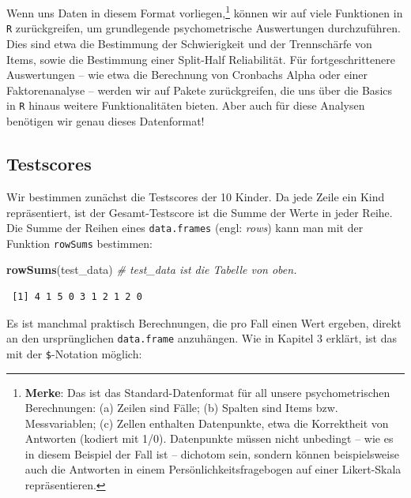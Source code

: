 \documentclass[12pt,]{tufte-book}
\newenvironment{Shaded}{\begin{snugshade}}{\end{snugshade}}
\newcommand{\KeywordTok}[1]{\textcolor[rgb]{0.13,0.29,0.53}{\textbf{#1}}}
\newcommand{\StringTok}[1]{\textcolor[rgb]{0.31,0.60,0.02}{#1}}
\newcommand{\CommentTok}[1]{\textcolor[rgb]{0.56,0.35,0.01}{\textit{#1}}}
\newcommand{\OperatorTok}[1]{\textcolor[rgb]{0.81,0.36,0.00}{\textbf{#1}}}
\newcommand{\NormalTok}[1]{#1}
\theoremstyle{definition}
\theoremstyle{definition}
\theoremstyle{definition}
\theoremstyle{remark}
\begin{document}
~

~

Wenn uns Daten in diesem Format vorliegen,\footnote{\textbf{Merke}: Das
  ist das Standard-Datenformat für all unsere psychometrischen
  Berechnungen: (a) Zeilen sind Fälle; (b) Spalten sind Items bzw.
  Messvariablen; (c) Zellen enthalten Datenpunkte, etwa die Korrektheit
  von Antworten (kodiert mit 1/0). Datenpunkte müssen nicht unbedingt --
  wie es in diesem Beispiel der Fall ist -- dichotom sein, sondern
  können beispielsweise auch die Antworten in einem
  Persönlichkeitsfragebogen auf einer Likert-Skala repräsentieren.}
können wir auf viele Funktionen in \texttt{R} zurückgreifen, um
grundlegende psychometrische Auswertungen durchzuführen. Dies sind etwa
die Bestimmung der Schwierigkeit und der Trennschärfe von Items, sowie
die Bestimmung einer Split-Half Reliabilität. Für fortgeschrittenere
Auswertungen -- wie etwa die Berechnung von Cronbachs Alpha oder einer
Faktorenanalyse -- werden wir auf Pakete zurückgreifen, die uns über die
Basics in \texttt{R} hinaus weitere Funktionalitäten bieten. Aber auch
für diese Analysen benötigen wir genau dieses Datenformat!

\subsection{Testscores}\label{testscores}

Wir bestimmen zunächst die Testscores der 10 Kinder. Da jede Zeile ein
Kind repräsentiert, ist der Gesamt-Testscore ist die Summe der Werte in
jeder Reihe. Die Summe der Reihen eines \texttt{data.frames} (engl:
\emph{rows}) kann man mit der Funktion \texttt{rowSums} bestimmen:

\begin{Shaded}
\begin{Highlighting}[]
\KeywordTok{rowSums}\NormalTok{(test_data)  }\CommentTok{# test_data ist die Tabelle von oben.}
\end{Highlighting}
\end{Shaded}

\begin{verbatim}
 [1] 4 1 5 0 3 1 2 1 2 0
\end{verbatim}

Es ist manchmal praktisch Berechnungen, die pro Fall einen Wert ergeben,
direkt an den ursprünglichen \texttt{data.frame} anzuhängen. Wie in
Kapitel 3 erklärt, ist das mit der \texttt{\$}-Notation möglich:

\begin{Shaded}
\end{Shaded}
\end{document}
